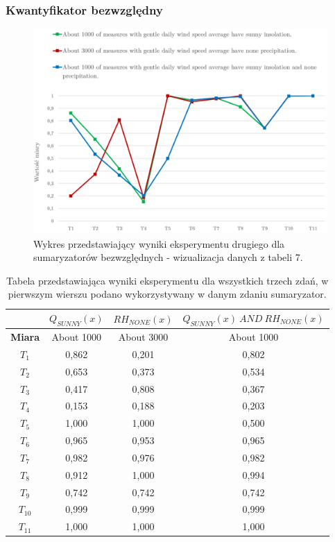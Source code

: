 \documentclass{classrep}
\begin{document}
\subsubsection{Kwantyfikator bezwzględny}

\begin{figure}[H]
	\centering
	\includegraphics[width=1\textwidth]{Pictures/ResultCharts/Eks2_2.png}
	\caption{Wykres przedstawiający wyniki eksperymentu drugiego dla sumaryzatorów bezwzględnych - wizualizacja danych z tabeli 7.}
\end{figure}


\begin{table}[H]
	\centering
	\begin{tabular}{c c c c} 
		\hline
		  &  $Q_{\textit{SUNNY}}(x)$ & ${RH}_{\textit{NONE}}(x)$ & ${Q}_{\textit{SUNNY}}(x) ~{AND}~ {RH}_{\textit{NONE}}(x)$\\ [0.5ex] 
		\hline
		\hline
		\textbf{Miara}  & {About 1000} & {About 3000} & {About 1000}\\ [0.5ex] 
		\hline
		\hline
$T_1$	&	0,862	&	0,201	&	0,802	\\
$T_2$	&	0,653	&	0,373	&	0,534	\\
$T_3$	&	0,417	&	0,808	&	0,367	\\
$T_4$	&	0,153	&	0,188	&	0,203	\\
$T_5$	&	1,000	&	1,000	&	0,500	\\
$T_6$	&	0,965	&	0,953	&	0,965	\\
$T_7$	&	0,982	&	0,976	&	0,982	\\
$T_8$	&	0,912	&	1,000	&	0,994	\\
$T_9$	&	0,742	&	0,742	&	0,742	\\
$T_{10}$	&	0,999	&	0,999	&	0,999	\\
$T_{11}$	&	1,000	&	1,000	&	1,000	\\
		\hline
	\end{tabular}
	\caption{Tabela przedstawiająca wyniki eksperymentu dla wszystkich trzech zdań, w pierwszym wierszu podano wykorzystywany w danym zdaniu sumaryzator.}
\end{table}
\end{document}
